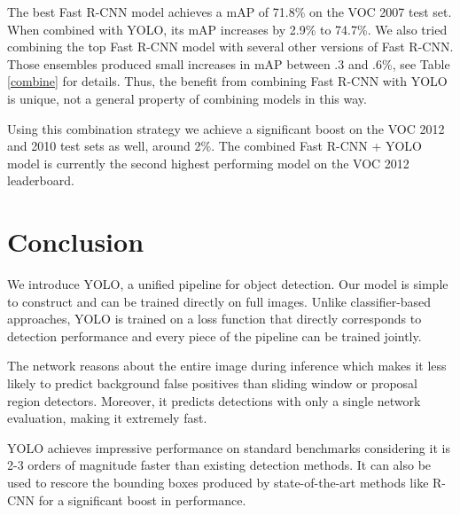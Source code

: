 \documentclass{article} %
\begin{document}
The best Fast R-CNN model achieves a mAP of 71.8\% on the VOC 2007 test set. When combined with YOLO, its mAP increases by 2.9\% to 74.7\%. We also tried combining the top Fast R-CNN model with several other versions of Fast R-CNN. Those ensembles produced small increases in mAP between .3 and .6\%, see Table \ref{combine} for details. Thus, the benefit from combining Fast R-CNN with YOLO is unique, not a general property of combining models in this way.

Using this combination strategy we achieve a significant boost on the VOC 2012 and 2010 test sets as well, around 2\%. The combined Fast R-CNN + YOLO model is currently the second highest performing model on the VOC 2012 leaderboard.

\section{Conclusion}

We introduce YOLO, a unified pipeline for object detection. Our model is simple to construct and can be trained directly on full images. Unlike classifier-based approaches, YOLO is trained on a loss function that directly corresponds to detection performance and every piece of the pipeline can be trained jointly.

The network reasons about the entire image during inference which makes it less likely to predict background false positives than sliding window or proposal region detectors. Moreover, it predicts detections with only a single network evaluation, making it extremely fast.

YOLO achieves impressive performance on standard benchmarks considering it is 2-3 orders of magnitude faster than existing detection methods. It can also be used to rescore the bounding boxes produced by state-of-the-art methods like R-CNN for a significant boost in performance.





{\small


}
\end{document}
